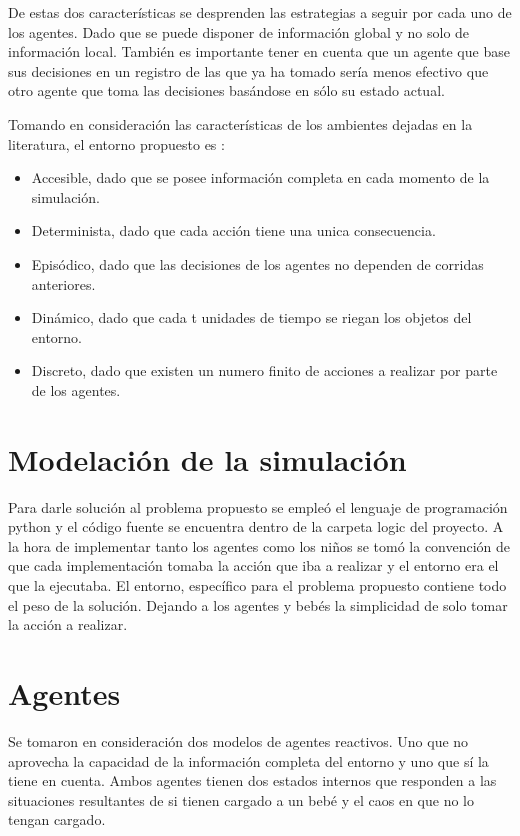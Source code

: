 \documentclass[a4paper,10pt,twocolumn]{article}
\begin{document}
	De estas dos características se desprenden las estrategias a seguir por cada uno de los agentes. Dado que se puede disponer de información global y no solo de información local. También es importante tener en cuenta que un agente que base sus decisiones en un registro de las que ya ha tomado sería menos efectivo que otro agente que toma las decisiones basándose en sólo su estado actual.
	
	Tomando en consideración las características de los ambientes dejadas en la literatura, el entorno propuesto es :
	
	\begin{itemize}
		\item Accesible, dado que se posee información completa en cada momento de la simulación.
		\item Determinista, dado que cada acción tiene una unica consecuencia.
		\item Episódico, dado que las decisiones de los agentes no dependen de corridas anteriores.
		\item Dinámico, dado que cada t unidades de tiempo se riegan los objetos del entorno.
		\item Discreto, dado que existen un numero finito de acciones a realizar por parte de los agentes.
	\end{itemize}
	
	
\section{Modelación de la simulación}

	Para darle solución al problema propuesto se empleó el lenguaje de programación python y el código fuente se encuentra dentro de la carpeta logic del proyecto. A la hora de implementar tanto los agentes como los niños se tomó la convención de que cada implementación tomaba la acción que iba a realizar y el entorno era el que la ejecutaba. El entorno, específico para el problema propuesto contiene todo el peso de la solución. Dejando a los agentes y bebés la simplicidad de solo tomar la acción a realizar.
	
\section{Agentes}
	
	Se tomaron en consideración dos modelos de agentes reactivos. Uno que no aprovecha la capacidad de la información completa del entorno y uno que sí la tiene en cuenta. Ambos agentes tienen dos estados internos que responden a las situaciones resultantes de si tienen cargado a un bebé y el caos en que no lo tengan cargado.
	
\end{document}
